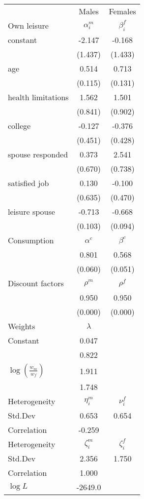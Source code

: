 \begin{tabular}{lcc} 
\hline\hline 
 & Males & Females \\ 
Own leisure & $\alpha_{i}^{m}$ & $\beta_{i}^{f}$ \\ 
constant & -2.147 & -0.168 \\ 
 & (1.437) & (1.433) \\ 
age & 0.514 & 0.713 \\ 
 & (0.115) & (0.131) \\ 
health limitations & 1.562 & 1.501 \\ 
 & (0.841) & (0.902) \\ 
college & -0.127 & -0.376 \\ 
 & (0.451) & (0.428) \\ 
spouse responded & 0.373 & 2.541 \\ 
 & (0.670) & (0.738) \\ 
satisfied job & 0.130 & -0.100 \\ 
 & (0.635) & (0.470) \\ 
leisure spouse & -0.713 & -0.668 \\ 
 & (0.103) & (0.094) \\ 
Consumption & $\alpha^{c}$ & $\beta^{c}$ \\ 
 & 0.801 & 0.568 \\ 
 & (0.060) & (0.051) \\ 
Discount factors & $\rho^m$ & $\rho^f$ \\ 
 & 0.950 & 0.950 \\ 
 & (0.000) & (0.000) \\ 
Weights & $\lambda$ &  \\ 
Constant & 0.047 &  \\ 
 & 0.822 &  \\ 
$\log(\frac{w_m}{w_f})$ & 1.911 &  \\ 
 & 1.748 &  \\ 
Heterogeneity & $\eta_i^m$ & $\nu_i^f$ \\ 
Std.Dev & 0.653 & 0.654 \\ 
Correlation & -0.259 &  \\ 
Heterogeneity & $\zeta_i^m$ & $\zeta_i^f$ \\ 
Std.Dev & 2.356 & 1.750 \\ 
Correlation & 1.000 &  \\ 
\hline 
$\log L$ & -2649.0 & \\ 
\hline \hline 
\end{tabular} 
